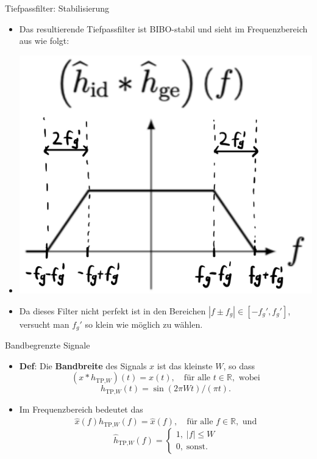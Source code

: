 \documentclass[14pt, aspectratio=169, handout]{beamer}
\begin{document}
\begin{frame}{Tiefpassfilter: Stabilisierung}
    \begin{itemize}
        \item Das resultierende Tiefpassfilter ist BIBO-stabil und sieht im Frequenzbereich aus wie folgt:
        \item[] \begin{center}
        \includegraphics[width=0.3\linewidth]{figures/h_stabil_2.jpg}
        \end{center}
        \item Da dieses Filter nicht perfekt ist in den Bereichen $|f \pm f_g| \in [-f_g', f_g']$, versucht man $f_g'$ so klein wie möglich zu wählen.
    \end{itemize}
\end{frame}

\begin{frame}{Bandbegrenzte Signale}
    \begin{itemize}
    \item \textbf{Def}: Die \textbf{Bandbreite} des Signals $x$ ist das kleinste $W$, so dass
    $$(x \ast h_{\text{TP,}W})(t) = x(t), \hspace{12pt} \text{für alle } t \in \mathbb{R}, \text{ wobei}$$
    $$h_{\text{TP,}W}(t) = \sin (2 \pi W t)/(\pi t).$$
    \item Im Frequenzbereich bedeutet das
    $$\hat{x}(f)\hat{h}_{\text{TP,}W}(f) = \hat{x}(f), \hspace{12pt} \text{für alle }f\in \mathbb{R}, \text{ und}$$
    $$\hat{h}_{\text{TP,}W}(f) = \begin{cases}
        1, \; |f| \leq W \\
        0, \; \text{sonst.}
    \end{cases}$$
    \end{itemize}
\end{frame}
\end{document}
